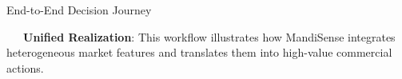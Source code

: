 \documentclass{beamer}
\begin{document}
\begin{frame}{End-to-End Decision Journey}
\vspace{0.15cm}
\begin{tcolorbox}[enhanced, colback=primaryblue!4, colframe=primaryblue!30, boxrule=0.35pt,
  arc=3.5pt, width=0.98\textwidth, left=4pt, right=4pt, top=2.5pt, bottom=2.5pt, boxsep=0pt,
  halign=center, shadow={0.5pt}{-0.5pt}{0pt}{black!8}]
    \fontsize{5.5pt}{6.5pt}\selectfont
    \textcolor{primaryDark}{~~~\textbf{Unified Realization}: This workflow illustrates how MandiSense integrates heterogeneous market features and translates them into high-value commercial actions.}
\end{tcolorbox}
\end{frame}

\end{document}
